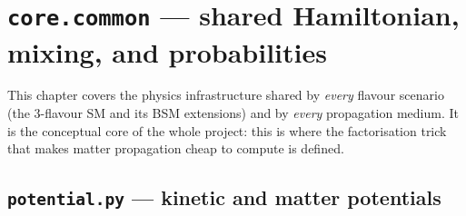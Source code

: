 \chapter{\texttt{core.common} --- shared Hamiltonian, mixing, and probabilities}
\label{ch:core-common}

This chapter covers the physics infrastructure shared by \emph{every} flavour
scenario (the 3-flavour SM and its BSM extensions) and by \emph{every}
propagation medium. It is the conceptual core of the whole project: this is
where the factorisation trick that makes matter propagation cheap to compute
is defined.

\section{\texttt{potential.py} --- kinetic and matter potentials}


